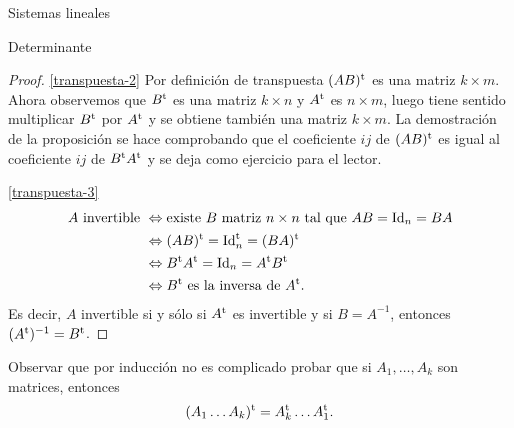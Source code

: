 \begin{chapter}{Sistemas lineales}
\begin{section}{Determinante}
\begin{proof}
        \ref{transpuesta-2}	Por definición de transpuesta $(AB)^{\operatorname{t}}$ es una matriz $k \times m$.  Ahora observemos  que $B^{\operatorname{t}}$  es una matriz $k \times n$ y $A^{\operatorname{t}}$ es $n \times m$, luego tiene sentido multiplicar $B^{\operatorname{t}}$ por $A^{\operatorname{t}}$ y se obtiene también  una matriz  $k \times m$. La demostración de la proposición se hace comprobando que el coeficiente $ij$ de $(AB)^{\operatorname{t}}$ es igual al coeficiente $ij$ de $B^{\operatorname{t}} A^{\operatorname{t}}$ y se deja como ejercicio para el lector. 
        
        \ref{transpuesta-3} 
        \begin{align*}
            \text{$A$ invertible } &\Leftrightarrow \text{existe $B$ matriz $n \times n$ tal que $AB = \operatorname{Id}_n = BA$} \\
            &\Leftrightarrow (AB)^{\operatorname{t}} = \operatorname{Id}^{\operatorname{t}}_n = (BA)^{\operatorname{t}}\\
            &\Leftrightarrow B^{\operatorname{t}} A^{\operatorname{t}} = \operatorname{Id}_n = A^{\operatorname{t}} B^{\operatorname{t}}\\
            &\Leftrightarrow \text{$B^{\operatorname{t}}$ es  la inversa de $A^{\operatorname{t}}$}. 
        \end{align*}
        Es decir, $A$ invertible si y sólo si  $A^{\operatorname{t}}$ es invertible y si $B = A^{-1}$, entonces  $(A^{\operatorname{t}})^{-1} = B^{\operatorname{t}}$.
    \end{proof}
    
    Observar que por inducción no es complicado probar que si $A_1,\ldots, A_k$ son matrices,  entonces 
    \begin{equation*}
    (A_1\ldots A_k)^{\operatorname{t}} = A_k^{\operatorname{t}}\ldots A_1^{\operatorname{t}}.
    \end{equation*}
    

\end{section}
\end{chapter}

